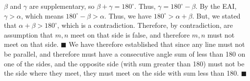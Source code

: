 \documentclass{report}
\begin{document}
    \bigbreak \noindent 
    \begin{figure}[ht]
        \centering
        \label{fig:figp4}
    \end{figure}
    \bigbreak \noindent 
    \bigbreak \noindent 
    $\beta$ and $\gamma$ are supplementary, so $\beta + \gamma = 180^{\circ}$. Thus, $\gamma = 180^{\circ} - \beta$. By the EAI, $\gamma > \alpha$, which means $180^{\circ} - \beta > \alpha$. Thus, we have $180^{\circ} > \alpha + \beta$. But, we stated that $\alpha + \beta > 180^{\circ}$, which is a contradiction. 
    \bigbreak \noindent 
    Therefore, by contradiction, are assumption that $m,n$ meet on that side is false, and therefore $m,n$ must not meet on that side.  \hspace*{\fill} $\blacksquare$
    \bigbreak \noindent
    We have therefore established that since any line must not be parallel, and therefore must have a consecutive angle sum of less than 180 on one of the sides, and the opposite side (with sum greater than 180) must not be the side where they meet, they must meet on the side with sum less than 180. \hspace*{\fill} $\blacksquare$




    
\end{document}
